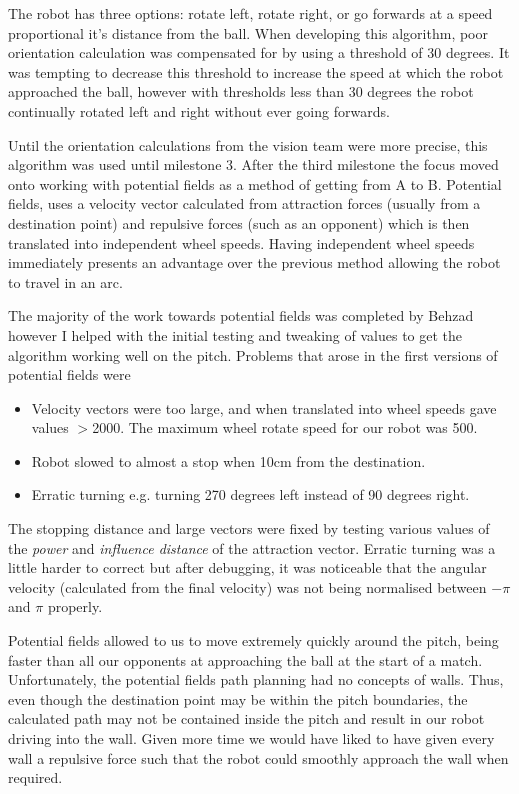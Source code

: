 \documentclass[conference,12pt]{IEEEtran}
\begin{document}
The robot has three options: rotate left, rotate right, or go forwards at a speed proportional it's distance from the ball. When developing this algorithm, poor orientation calculation was compensated for by using a threshold of 30 degrees. It was tempting to decrease this threshold to increase the speed at which the robot approached the ball, however with thresholds less than 30 degrees the robot continually rotated left and right without ever going forwards.

Until the orientation calculations from the vision team were more precise, this algorithm was used until milestone 3. After the third milestone the focus moved onto working with potential fields as a method of getting from A to B. Potential fields, uses a velocity vector calculated from attraction forces (usually from a destination point) and repulsive forces (such as an opponent) which is then translated into independent wheel speeds. Having independent wheel speeds immediately presents an advantage over the previous method allowing the robot to travel in an arc.

The majority of the work towards potential fields was completed by Behzad however I helped with the initial testing and tweaking of values to get the algorithm working well on the pitch. Problems that arose in the first versions of potential fields were
\begin{itemize}
\item Velocity vectors were too large, and when translated into wheel speeds gave values $>$2000. The maximum wheel rotate speed for our robot was 500.
\item Robot slowed to almost a stop when 10cm from the destination.
\item Erratic turning e.g. turning 270 degrees left instead of 90 degrees right.
\end{itemize}
The stopping distance and large vectors were fixed by testing various values of the \textit{power} and \textit{influence distance} of the attraction vector. Erratic turning was a little harder to correct but after debugging, it was noticeable that the angular velocity (calculated from the final velocity) was not being normalised between $-\pi$ and $\pi$ properly.

Potential fields allowed to us to move extremely quickly around the pitch, being faster than all our opponents at approaching the ball at the start of a match. Unfortunately, the potential fields path planning had no concepts of walls. Thus, even though the destination point may be within the pitch boundaries, the calculated path may not be contained inside the pitch and result in our robot driving into the wall. Given more time we would have liked to have given every wall a repulsive force such that the robot could smoothly approach the wall when required.
\end{document}
